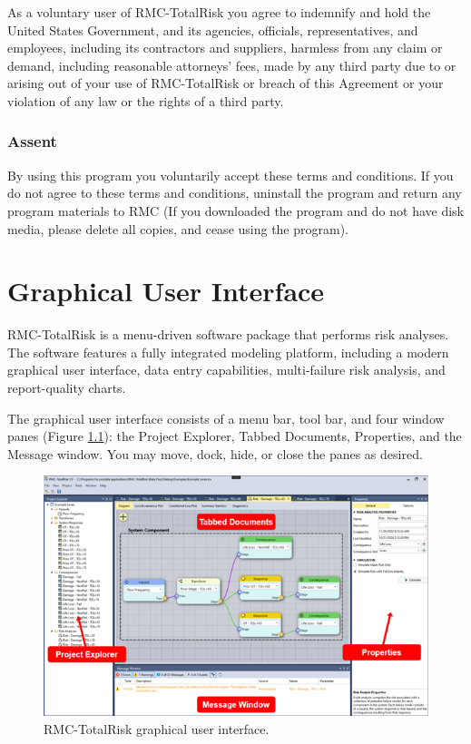 \documentclass[
]{book}
\begin{document}
As a voluntary user of RMC-TotalRisk you agree to indemnify and hold the United States Government, and its agencies, officials, representatives, and employees, including its contractors and suppliers, harmless from any claim or demand, including reasonable attorneys' fees, made by any third party due to or arising out of your use of RMC-TotalRisk or breach of this Agreement or your violation of any law or the rights of a third party.

\hypertarget{assent}{%
\subsection{Assent}\label{assent}}

By using this program you voluntarily accept these terms and conditions. If you do not agree to these terms and conditions, uninstall the program and return any program materials to RMC (If you downloaded the program and do not have disk media, please delete all copies, and cease using the program).

\hypertarget{gui}{%
\chapter{Graphical User Interface}\label{gui}}

RMC-TotalRisk is a menu-driven software package that performs risk analyses. The software features a fully integrated modeling platform, including a modern graphical user interface, data entry capabilities, multi-failure risk analysis, and report-quality charts.

The graphical user interface consists of a menu bar, tool bar, and four window panes (Figure \ref{fig:figure-4}): the Project Explorer, Tabbed Documents, Properties, and the Message window. You may move, dock, hide, or close the panes as desired.

\begin{figure}

{\centering \includegraphics{images/figure4} 

}

\caption{RMC-TotalRisk graphical user interface.}\label{fig:figure-4}
\end{figure}
\end{document}
